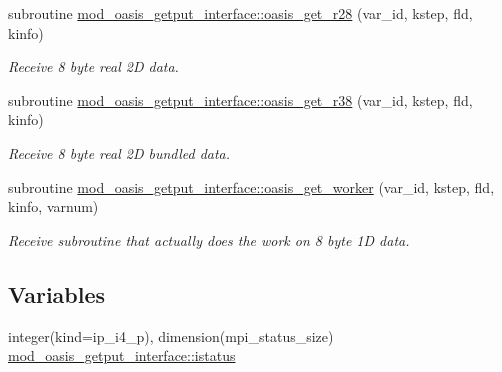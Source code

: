 \begin{DoxyCompactItemize}
subroutine \hyperlink{namespacemod__oasis__getput__interface_a017bdff12b2f7c29e6e76b303d452d4b}{mod\+\_\+oasis\+\_\+getput\+\_\+interface\+::oasis\+\_\+get\+\_\+r28} (var\+\_\+id, kstep, fld, kinfo)
\begin{DoxyCompactList}\small\item\em Receive 8 byte real 2D data. \end{DoxyCompactList}\item 
subroutine \hyperlink{namespacemod__oasis__getput__interface_a3113b8b9e8d879a631b856a20b30c699}{mod\+\_\+oasis\+\_\+getput\+\_\+interface\+::oasis\+\_\+get\+\_\+r38} (var\+\_\+id, kstep, fld, kinfo)
\begin{DoxyCompactList}\small\item\em Receive 8 byte real 2D bundled data. \end{DoxyCompactList}\item 
subroutine \hyperlink{namespacemod__oasis__getput__interface_a7817d0a31632e3a6c9137e517e7acc3d}{mod\+\_\+oasis\+\_\+getput\+\_\+interface\+::oasis\+\_\+get\+\_\+worker} (var\+\_\+id, kstep, fld, kinfo, varnum)
\begin{DoxyCompactList}\small\item\em Receive subroutine that actually does the work on 8 byte 1D data. \end{DoxyCompactList}\end{DoxyCompactItemize}
\subsection*{Variables}
\begin{DoxyCompactItemize}
\item 
integer(kind=ip\+\_\+i4\+\_\+p), dimension(mpi\+\_\+status\+\_\+size) \hyperlink{namespacemod__oasis__getput__interface_a2ceaaa5740216799f651b8dacb42b239}{mod\+\_\+oasis\+\_\+getput\+\_\+interface\+::istatus}
\end{DoxyCompactItemize}
